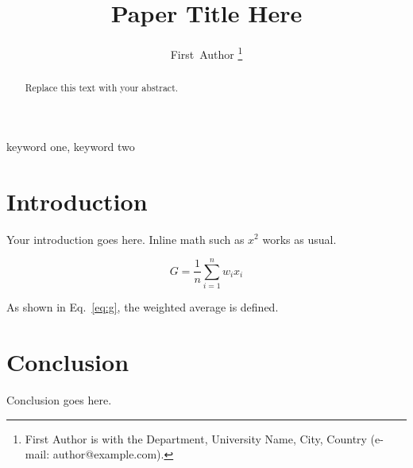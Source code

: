 \documentclass[journal]{IEEEtran}
\begin{document}
\title{Paper Title Here}

\author{First~Author%
\thanks{First Author is with the Department, University Name, City, Country (e-mail: author@example.com).}}

\maketitle

\begin{abstract}
Replace this text with your abstract.
\end{abstract}

\begin{IEEEkeywords}
keyword one, keyword two
\end{IEEEkeywords}

\section{Introduction}
Your introduction goes here. Inline math such as $x^2$ works as usual.

\begin{equation}
G = \frac{1}{n}\sum_{i=1}^{n} w_i x_i
\label{eq:g}
\end{equation}

As shown in Eq.~\ref{eq:g}, the weighted average is defined.

\section{Conclusion}
Conclusion goes here.
\end{document}
